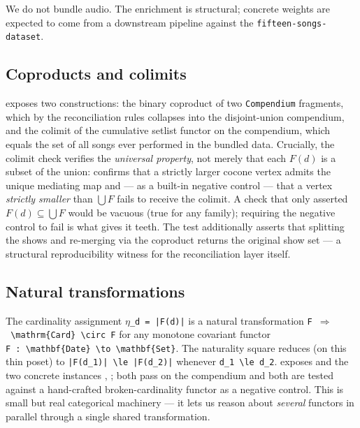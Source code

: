 \documentclass[
]{article}
\begin{document}
We do not bundle audio. The enrichment is structural; concrete weights
are expected to come from a downstream pipeline against the
\texttt{fifteen-songs-dataset}.

\subsection{Coproducts and colimits}\label{coproducts-and-colimits}

 exposes two constructions: the binary
coproduct of two \texttt{Compendium} fragments, which by the
reconciliation rules collapses into the disjoint-union compendium, and
the colimit of the cumulative setlist functor on the compendium, which
equals the set of all songs ever performed in the bundled data.
Crucially, the colimit check verifies the \emph{universal property}, not
merely that each \(F(d)\) is a subset of the union:
 confirms that a strictly larger cocone
vertex admits the unique mediating map and --- as a built-in negative
control --- that a vertex \emph{strictly smaller} than \(\bigcup F\)
fails to receive the colimit. A check that only asserted
\(F(d) \subseteq \bigcup F\) would be vacuous (true for any family);
requiring the negative control to fail is what gives it teeth. The test
 additionally asserts that
splitting the shows and re-merging via the coproduct returns the
original show set --- a structural reproducibility witness for the
reconciliation layer itself.

\subsection{Natural transformations}\label{natural-transformations}

The cardinality assignment \texttt{\texorpdfstring{\ensuremath{\eta}}{eta}\_d\ =\ |{}F(d)|{}} is
a natural transformation
\texttt{F\ \texorpdfstring{\ensuremath{\Longrightarrow}}{==>}\ \textbackslash{}mathrm\{Card\}\ \textbackslash{}circ\ F}
for any monotone covariant functor
\texttt{F\ :\ \textbackslash{}mathbf\{Date\}\ \textbackslash{}to\ \textbackslash{}mathbf\{Set\}}.
The naturality square reduces (on this thin poset) to
\texttt{|{}F(d\_1)|{}\ \textbackslash{}le\ |{}F(d\_2)|{}}
whenever \texttt{d\_1\ \textbackslash{}le\ d\_2}.
 exposes
 and the two concrete instances
,
; both pass on the
compendium and both are tested against a hand-crafted broken-cardinality
functor as a negative control. This is small but real categorical
machinery --- it lets us reason about \emph{several} functors in
parallel through a single shared transformation.
\end{document}
